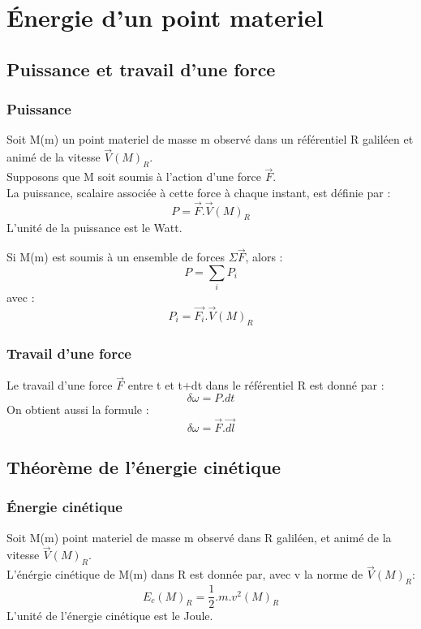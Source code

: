 \chapter{\'Energie d'un point materiel}
\section{Puissance et travail d'une force}
\subsection{Puissance}
\begin{de}
Soit M(m) un point materiel de masse m observé dans un référentiel R galiléen et animé de la vitesse $\overrightarrow{V}(M)_R$.\\
Supposons que M soit soumis à l'action d'une force $\overrightarrow{F}$.\\
La puissance, scalaire associée à cette force à chaque instant, est définie par :
$$P = \overrightarrow{F}.\overrightarrow{V}(M)_R$$
L'unité de la puissance est le Watt.
\end{de}
\begin{prop}
Si M(m) est soumis à un ensemble de forces $\Sigma \overrightarrow{F}$, alors :
$$P = \sum_i P_i$$
avec :
$$P_i = \overrightarrow{F_i}.\overrightarrow{V}(M)_R$$
\end{prop}
\subsection{Travail d'une force}
\begin{de}
Le travail d'une force $\overrightarrow{F}$ entre t et t+dt dans le référentiel R est donné par :
$$\delta\omega = P.dt$$
On obtient aussi la formule :
$$\delta\omega = \overrightarrow{F}.\overrightarrow{dl}$$
\end{de}
\section{Théorème de l'énergie cinétique}
\subsection{Énergie cinétique}
\begin{de}
Soit M(m) point materiel de masse m observé dans R galiléen, et animé de la vitesse $\overrightarrow{V}(M)_R$.\\
L'énérgie cinétique de M(m) dans R est donnée par, avec v la norme de $\overrightarrow{V}(M)_R$:
$$E_c(M)_R = \dfrac{1}{2}.m.v^2(M)_R$$
L'unité de l'énergie cinétique est le Joule.
\end{de}
